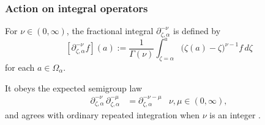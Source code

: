 \documentclass{article}
\theoremstyle{plain}
\newcommand{\fracderiv}[3]{\partial^{#1}_{#2, #3}}
\newcommand{\domain}{\Omega}
\begin{document}
\subsubsection{Action on integral operators}\label{L-int-op}
For $\nu \in (0, \infty)$, the fractional integral $\partial^{-\nu}_{\zeta, \alpha}$ is defined by
\[ [\partial^{-\nu}_{\zeta, \alpha} f](a) := \frac{1}{\Gamma(\nu)} \int_{\zeta = \alpha}^a \big(\zeta(a)-\zeta\big)^{\nu-1} f\,d\zeta \]
for each $a \in \domain_\alpha$.

It obeys the expected semigroup law \cite[Section~1.3]{mladenov2014advanced}
\begin{align*}
\fracderiv{-\nu}{\zeta}{\alpha}\,\fracderiv{-\mu}{\zeta}{\alpha} & = \fracderiv{-\nu-\mu}{\zeta}{\alpha} & \nu, \mu \in (0, \infty),
\end{align*}
and agrees with ordinary repeated integration when $\nu$ is an integer \cite[Equation~35]{mladenov2014advanced}.


\end{document}
